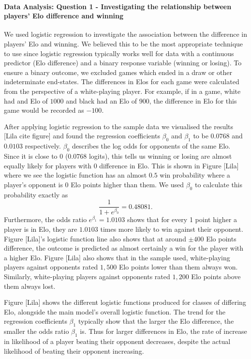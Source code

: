 \documentclass[10pt,a4paper,twocolumn]{article}
\begin{document}

\paragraph{Data Analysis: Question 1 - Investigating the relationship between players' Elo difference and winning}

We used logistic regression to investigate the association between the difference in players' Elo and winning. We believed this to be the most appropriate technique to use since logistic regression typically works well for data with a continuous predictor (Elo difference) and a binary response variable (winning or losing). To ensure a binary outcome, we excluded games which ended in a draw or other indeterminate end-states. The differences in Elos for each game were calculated from the perspective of a white-playing player. For example, if in a game, white had and Elo of $1000$ and black had an Elo of $900$, the difference in Elo for this game would be recorded as $-100$.

After applying logistic regression to the sample data we visualised the results [Lila cite figure] and found the regression coefficients $\beta_{0}$ and $\beta_{1}$ to be $0.0768$ and $0.0103$ respectively. $\beta_{0}$ describes the log odds for opponents of the same Elo. Since it is close to $0$ ($0.0768$ logits), this tells us winning or losing are almost equally likely for players with $0$ difference in Elo. This is shown in Figure [Lila] where we see the logistic function has an almost $0.5$ win probability where a player's opponent is $0$ Elo points higher than them. We used $\beta_{0}$ to calculate this probability exactly as 
$$\displaystyle\frac{1}{1+e^{\beta_{0}}} = 0.48081.$$
Furthermore, the odds ratio $e^{\beta_{1}} = 1.0103$ shows that for every 1 point higher a player is in Elo, they are $1.0103$ times more likely to win against their opponent. Figure [Lila]'s logistic function line also shows that at around $\pm 400$ Elo points difference, the outcome is predicted as almost certainly a win for the player with a higher Elo. Figure [Lila] also shows that in the sample used, white-playing players against opponents rated $1,500$ Elo points lower than them always won. Similarly, white-playing players against opponents rated $1,200$ Elo points above them always lost. \newline

Figure [Lila] shows the different logistic functions produced for classes of differing Elo, alongside the main model's overall logistic function. The trend for the regression coefficients $\beta_{1}$ typically show that the larger the Elo difference, the smaller the odds ratio $\beta_{1}$ is. Thus for larger differences in Elo, the rate of increase in likelihood of a player beating their opponent decreases, despite the actual likelihood of beating their opponent increasing. \newline
\end{document}
